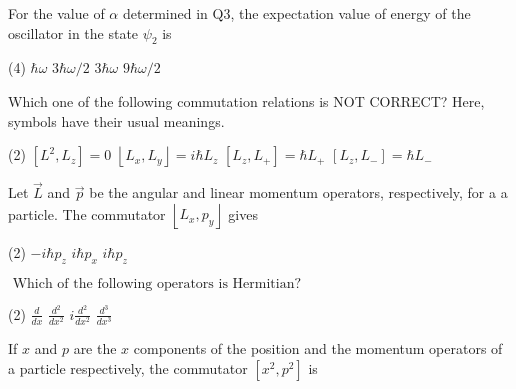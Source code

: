 \begin{enumerate}
\begin{minipage}{\textwidth}
	\item For the value of $\alpha$ determined in $\mathrm{Q} 3$, the expectation value of energy of the oscillator in the state $\psi_{2}$ is
\end{minipage}
\begin{tasks}(4)
	\task[\textbf{A.}] $\hbar \omega$
	\task[\textbf{B.}]$3 \hbar \omega / 2$ 
	\task[\textbf{C.}]$3 \hbar \omega$
	\task[\textbf{D.}]$9 \hbar \omega / 2$
\end{tasks}
\begin{minipage}{\textwidth}
	\item Which one of the following commutation relations is NOT CORRECT? Here, symbols have their usual meanings.
\end{minipage}
\begin{tasks}(2)
	\task[\textbf{A.}] $\left[L^{2}, L_{z}\right]=0$
	\task[\textbf{B.}]$\left\lfloor L_{x}, L_{y}\right\rfloor=i \hbar L_{z}$
	\task[\textbf{C.}]$\left[L_{z}, L_{+}\right]=\hbar L_{+}$
	\task[\textbf{D.}] $\left[L_{z}, L_{-}\right]=\hbar L_{-}$
\end{tasks}
\begin{minipage}{\textwidth}
	\item Let $\vec{L}$ and $\vec{p}$ be the angular and linear momentum operators, respectively, for a a particle. The commutator $\left\lfloor L_{x}, p_{y}\right\rfloor$ gives
\end{minipage}
\begin{tasks}(2)
	\task[\textbf{A.}] $-i \hbar p_{z}$
	\task[\textbf{C.}]$i \hbar p_{x}$
	\task[\textbf{D.}]$i \hbar p_{z}$
\end{tasks}
\begin{minipage}{\textwidth}
	\item $\text { Which of the following operators is Hermitian? }$
\end{minipage}
\begin{tasks}(2)
	\task[\textbf{A.}] $\frac{d}{d x}$
	\task[\textbf{B.}]$\frac{d^{2}}{d x^{2}}$
	\task[\textbf{C.}]$i \frac{d^{2}}{d x^{2}}$
	\task[\textbf{D.}]$\frac{d^{3}}{d x^{3}}$
\end{tasks}
\begin{minipage}{\textwidth}
	\item If $x$ and $p$ are the $x$ components of the position and the momentum operators of a particle respectively, the commutator $\left[x^{2}, p^{2}\right]$ is
\end{minipage}

\end{enumerate}
